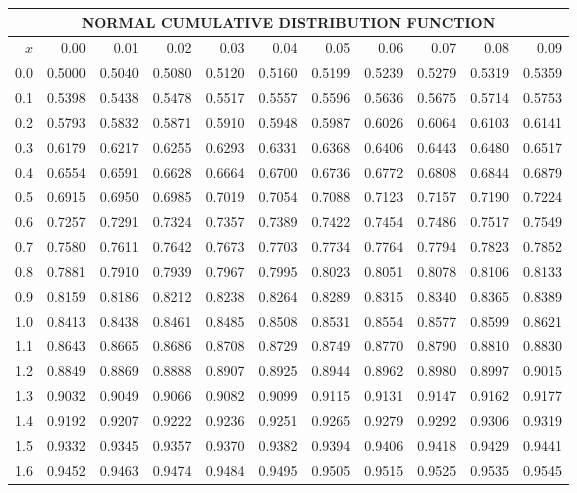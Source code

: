 \vspace{1cm}
\begin{center}
    \begin{tabular}{|r|r@{\ }r@{\ }r@{\ }r@{\ }r@{\ }r@{\ }r@{\ }r@{\ }r@{\ }r@{\ }|}
    \hline
    \multicolumn{11}{|c|}{NORMAL CUMULATIVE DISTRIBUTION FUNCTION}\\
    \hline
    \hline
    $x$&0.00&0.01&0.02&0.03&0.04&0.05&0.06&0.07&0.08&0.09\\
    \hline
    0.0&0.5000&0.5040&0.5080&0.5120&0.5160&0.5199&0.5239&0.5279&0.5319&0.5359\\
    \hline
    0.1&0.5398&0.5438&0.5478&0.5517&0.5557&0.5596&0.5636&0.5675&0.5714&0.5753\\
    \hline
    0.2&0.5793&0.5832&0.5871&0.5910&0.5948&0.5987&0.6026&0.6064&0.6103&0.6141\\
    \hline
    0.3&0.6179&0.6217&0.6255&0.6293&0.6331&0.6368&0.6406&0.6443&0.6480&0.6517\\
    \hline
    0.4&0.6554&0.6591&0.6628&0.6664&0.6700&0.6736&0.6772&0.6808&0.6844&0.6879\\
    \hline
    0.5&0.6915&0.6950&0.6985&0.7019&0.7054&0.7088&0.7123&0.7157&0.7190&0.7224\\
    \hline
    0.6&0.7257&0.7291&0.7324&0.7357&0.7389&0.7422&0.7454&0.7486&0.7517&0.7549\\
    \hline
    0.7&0.7580&0.7611&0.7642&0.7673&0.7703&0.7734&0.7764&0.7794&0.7823&0.7852\\
    \hline
    0.8&0.7881&0.7910&0.7939&0.7967&0.7995&0.8023&0.8051&0.8078&0.8106&0.8133\\
    \hline
    0.9&0.8159&0.8186&0.8212&0.8238&0.8264&0.8289&0.8315&0.8340&0.8365&0.8389\\
    \hline
    1.0&0.8413&0.8438&0.8461&0.8485&0.8508&0.8531&0.8554&0.8577&0.8599&0.8621\\
    \hline
    1.1&0.8643&0.8665&0.8686&0.8708&0.8729&0.8749&0.8770&0.8790&0.8810&0.8830\\
    \hline
    1.2&0.8849&0.8869&0.8888&0.8907&0.8925&0.8944&0.8962&0.8980&0.8997&0.9015\\
    \hline
    1.3&0.9032&0.9049&0.9066&0.9082&0.9099&0.9115&0.9131&0.9147&0.9162&0.9177\\
    \hline
    1.4&0.9192&0.9207&0.9222&0.9236&0.9251&0.9265&0.9279&0.9292&0.9306&0.9319\\
    \hline
    1.5&0.9332&0.9345&0.9357&0.9370&0.9382&0.9394&0.9406&0.9418&0.9429&0.9441\\
    \hline
    1.6&0.9452&0.9463&0.9474&0.9484&0.9495&0.9505&0.9515&0.9525&0.9535&0.9545\\

\end{tabular}
\end{center}
